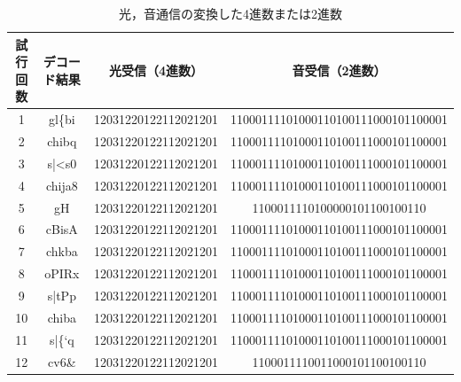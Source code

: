 \begin{table}[htbp]
    \centering
    \caption{光，音通信の変換した4進数または2進数}
    \label{table:result2}
    \begin{tabular}{|c|c|c|c|} \hline
        試行回数  &デコード結果 &光受信（4進数） &音受信（2進数） \\ \hline
        1   &gl\{bi &12031220122112021201  &11000111101000110100111000101100001  \\ \hline
        2   &chibq  &12031220122112021201  &11000111101000110100111000101100001  \\ \hline
        3   &s|<s0  &12031220122112021201  &11000111101000110100111000101100001  \\ \hline
        4   &chija8 &12031220122112021201  &11000111101000110100111000101100001  \\ \hline
        5   &gH     &12031220122112021201  &1100011110100000101100100110         \\ \hline
        6   &cBisA  &12031220122112021201  &11000111101000110100111000101100001  \\ \hline
        7   &chkba  &12031220122112021201  &11000111101000110100111000101100001  \\ \hline
        8   &oPIRx  &12031220122112021201  &11000111101000110100111000101100001  \\ \hline
        9   &s|tPp  &12031220122112021201  &11000111101000110100111000101100001  \\ \hline
        10  &chiba  &12031220122112021201  &11000111101000110100111000101100001  \\ \hline
        11  &s|\{`q &12031220122112021201  &11000111101000110100111000101100001  \\ \hline
        12  &cv6\&  &12031220122112021201  &1100011110011000101100100110         \\ \hline
    \end{tabular}
\end{table}

